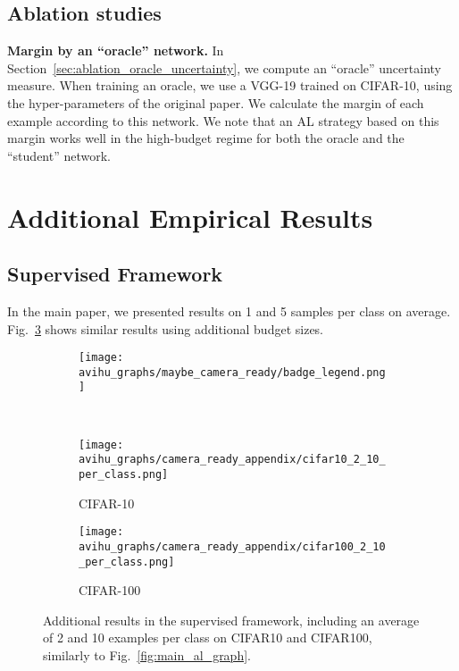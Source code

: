 \documentclass{article}
\newcommand{\myparagraph}[1]{\smallskip\noindent\textbf{#1}}
\begin{document}
\subsection{Ablation studies}
\label{app:sec:ablation_details}
\myparagraph{Margin by an ``oracle'' network.} In Section~\ref{sec:ablation_oracle_uncertainty}, we compute an ``oracle'' uncertainty measure. When training an oracle, we use a VGG-19 \citep{simonyan2014very} trained on CIFAR-10, using the hyper-parameters of the original paper. We calculate the margin of each example according to this network. We note that an AL strategy based on this margin works well in the high-budget regime for both the oracle and the ``student'' network.

\section{Additional Empirical Results}
\label{app:more_empirical}

\subsection{Supervised Framework}
\label{app:more_sup_empirical}
In the main paper, we presented results on 1 and 5 samples per class on average. Fig.~\ref{fig:app_cifar_more_budgets} shows similar results using additional budget sizes.


\begin{figure}[thb!]
\begin{center}
\begin{subfigure}{.45\textwidth}
  \centering
 \texttt{[image: avihu\_graphs/maybe\_camera\_ready/badge\_legend.png]}
\end{subfigure}
\\
    \begin{subfigure}{.157\textwidth}
      \centering
      \texttt{[image: avihu\_graphs/camera\_ready\_appendix/cifar10\_2\_10\_per\_class.png]}
\caption{CIFAR-10}
    \label{fig:app_al_graph_cifar10}
    \end{subfigure}
    \begin{subfigure}{.157\textwidth}
      \centering
      \texttt{[image: avihu\_graphs/camera\_ready\_appendix/cifar100\_2\_10\_per\_class.png]}
\caption{CIFAR-100}
    \label{fig:app_al_graph_cifar100}
    \end{subfigure}


\caption{Additional results in the supervised framework, including an average of 2 and 10 examples per class on CIFAR10 and CIFAR100, similarly to Fig.~\ref{fig:main_al_graph}.}
\label{fig:app_cifar_more_budgets}
\end{center}
\end{figure}
\end{document}
